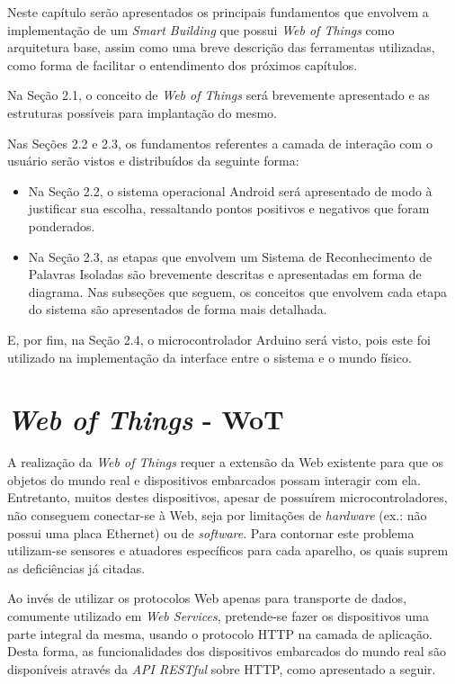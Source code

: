 \documentclass[12pt,a4paper,oneside]{report}
\begin{document}
Neste capítulo serão apresentados os principais fundamentos que envolvem a implementação de um \emph{Smart Building} que possui \emph{Web of Things} como arquitetura base, assim como uma breve descrição das ferramentas utilizadas, como forma de facilitar o entendimento dos próximos capítulos.

Na Seção 2.1, o conceito de \emph{Web of Things} será brevemente apresentado e as estruturas possíveis para implantação do mesmo.

Nas Seções 2.2 e 2.3, os fundamentos referentes a camada de interação com o usuário serão vistos e distribuídos da seguinte forma:
\begin{itemize}
    \item Na Seção 2.2, o sistema operacional Android será apresentado de modo à justificar sua escolha, ressaltando pontos positivos e negativos que foram ponderados.
    \item Na Seção 2.3, as etapas que envolvem um Sistema de Reconhecimento de Palavras Isoladas são brevemente descritas e apresentadas em forma de diagrama. Nas subseções que seguem, os conceitos que envolvem cada etapa do sistema são apresentados de forma mais detalhada.
\end{itemize}

E, por fim, na Seção 2.4, o microcontrolador Arduino será visto, pois este foi utilizado na implementação da interface entre o sistema e o mundo físico.

%
%
\section{\emph{Web of Things} - WoT}

A realização da \emph{Web of Things} requer a extensão da Web existente para que os objetos do mundo real e dispositivos embarcados possam interagir com ela. Entretanto, muitos destes dispositivos, apesar de possuírem microcontroladores, não conseguem conectar-se à Web, seja por limitações de \emph{hardware} (ex.: não possui uma placa Ethernet) ou de \emph{software}. Para contornar este problema utilizam-se sensores e atuadores específicos para cada aparelho, os quais suprem as deficiências já citadas.

Ao invés de utilizar os protocolos Web apenas para transporte de dados, comumente utilizado em \emph{Web Services}, pretende-se fazer os dispositivos uma parte integral da mesma, usando o protocolo HTTP na camada de aplicação. Desta forma, as funcionalidades dos dispositivos embarcados do mundo real são disponíveis através da \emph{API RESTful} \cite{restws} sobre HTTP, como apresentado a seguir.
\end{document}
